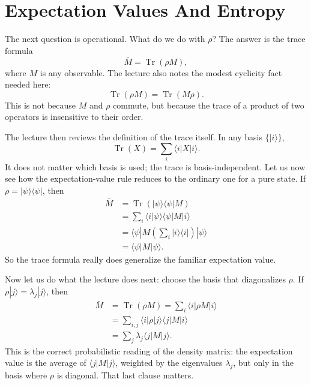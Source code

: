 \section{Expectation Values And Entropy}

The next question is operational. What do we do with \(\rho\)? The answer is the trace formula
\begin{equation}
\bar M = \operatorname{Tr}(\rho M),
\end{equation}
where \(M\) is any observable. The lecture also notes the modest cyclicity fact needed here:
\begin{equation}
\operatorname{Tr}(\rho M) = \operatorname{Tr}(M\rho).
\end{equation}
This is not because \(M\) and \(\rho\) commute, but because the trace of a product of two operators is insensitive to their order.

The lecture then reviews the definition of the trace itself. In any basis \(\{|i\rangle\}\),
\begin{equation}
\operatorname{Tr}(X) = \sum_i \langle i|X|i\rangle.
\end{equation}
It does not matter which basis is used; the trace is basis-independent. Let us now see how the expectation-value rule reduces to the ordinary one for a pure state. If \(\rho = |\psi\rangle\langle\psi|\), then
\begin{align}
\bar M
&= \operatorname{Tr}(|\psi\rangle\langle\psi|M) \\
&= \sum_i \langle i|\psi\rangle\langle\psi|M|i\rangle \\
&= \langle\psi|M\left(\sum_i |i\rangle\langle i|\right)|\psi\rangle \\
&= \langle\psi|M|\psi\rangle.
\end{align}
So the trace formula really does generalize the familiar expectation value.

Now let us do what the lecture does next: choose the basis that diagonalizes \(\rho\). If \(\rho |j\rangle = \lambda_j |j\rangle\), then
\begin{align}
\bar M
&= \operatorname{Tr}(\rho M)
 = \sum_i \langle i|\rho M|i\rangle \\
&= \sum_{i,j}\langle i|\rho|j\rangle \langle j|M|i\rangle \\
&= \sum_j \lambda_j \langle j|M|j\rangle.
\end{align}
This is the correct probabilistic reading of the density matrix: the expectation value is the average of \(\langle j|M|j\rangle\), weighted by the eigenvalues \(\lambda_j\), but only in the basis where \(\rho\) is diagonal. That last clause matters.

